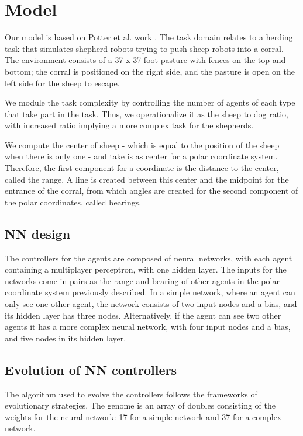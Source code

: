 \documentclass[conference]{IEEEtran}
\begin{document}
\section{Model}
Our model is based on Potter et al. work \cite{potter2001heterogeneity}. The task domain relates to a herding task that simulates shepherd robots trying to push sheep robots into a corral. The environment consists of a 37 x 37 foot pasture with fences on the top and bottom; the corral is positioned on the right side, and the pasture is open on the left side for the sheep to escape.

We module the task complexity by controlling the number of agents of each type that take part in the task. Thus, we operationalize it as the sheep to dog ratio, with increased ratio implying a more complex task for the shepherds. 

We compute the center of sheep - which is equal to the position of the sheep when there is only one - and take is as center for a polar coordinate system. Therefore, the first component for a coordinate is the distance to the center, called the range. A line is created between this center and the midpoint for the entrance of the corral, from which angles are created for the second component of the polar coordinates, called bearings. 


\subsection{NN design}
The controllers for the agents are composed of neural networks, with each agent containing a multiplayer perceptron, with one hidden layer. The inputs for the networks come in pairs as the range and bearing of other agents in the polar coordinate system previously described. In a simple network, where an agent can only see one other agent, the network consists of two input nodes and a bias, and its hidden layer has three nodes. Alternatively, if the agent can see two other agents it has a more complex neural network, with four input nodes and a bias, and five nodes in its hidden layer. 

\subsection{Evolution of NN controllers}
The algorithm used to evolve the controllers follows the frameworks of evolutionary strategies. The genome is an array of doubles consisting of the weights for the neural network: 17 for a simple network and 37 for a complex network.
\end{document}

